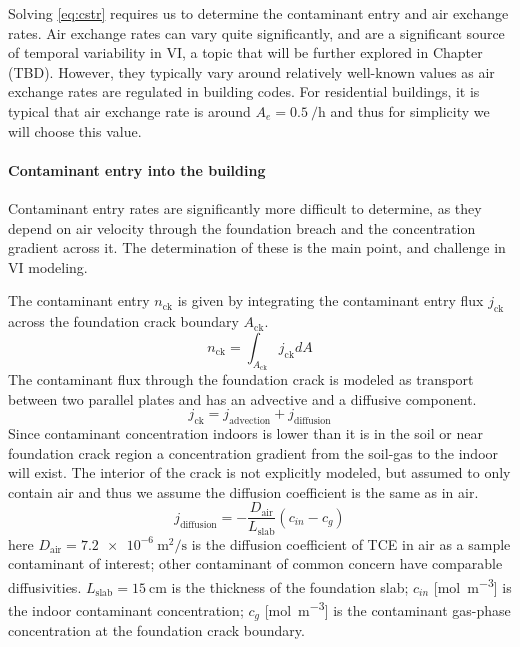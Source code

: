 Solving \eqref{eq:cstr} requires us to determine the contaminant entry and air exchange rates.
Air exchange rates can vary quite significantly, and are a significant source of temporal variability in VI, a topic that will be further explored in Chapter (TBD). %
However, they typically vary around relatively well-known values as air exchange rates are regulated in building codes.
For residential buildings, it is typical that air exchange rate is around $A_e = \SI{0.5}{\per\hour}$ and thus for simplicity we will choose this value.\par

\paragraph{Contaminant entry into the building}

Contaminant entry rates are significantly more difficult to determine, as they depend on air velocity through the foundation breach and the concentration gradient across it.
The determination of these is the main point, and challenge in VI modeling.\par


The contaminant entry $n_\mathrm{ck}$ is given by integrating the contaminant entry flux $j_\mathrm{ck}$ across the foundation crack boundary $A_\mathrm{ck}$.
\begin{equation}
  n_\mathrm{ck} = \int_{A_\mathrm{ck}} j_\mathrm{ck} dA
\end{equation}
The contaminant flux through the foundation crack is modeled as transport between two parallel plates and has an advective and a diffusive component.
\begin{equation}
  j_\mathrm{ck} = j_\mathrm{advection} + j_\mathrm{diffusion}
\end{equation}
Since contaminant concentration indoors is lower than it is in the soil or near foundation crack region a concentration gradient from the soil-gas to the indoor will exist.
The interior of the crack is not explicitly modeled, but assumed to only contain air and thus we assume the diffusion coefficient is the same as in air.
\begin{equation}
  j_\mathrm{diffusion} = - \frac{D_\mathrm{air}}{L_\mathrm{slab}} (c_{in} - c_g)
\end{equation}
here $D_\mathrm{air} = \SI{7.2e-6}{\metre\squared\per\second}$ is the diffusion coefficient of TCE in air as a sample contaminant of interest; other contaminant of common concern have comparable diffusivities. %
$L_\mathrm{slab} = \SI{15}{\centi\metre}$ is the thickness of the foundation slab;
$c_{in}$ [\si{\mol\per\metre\cubed}] is the indoor contaminant concentration;
$c_g$ [\si{\mol\per\metre\cubed}] is the contaminant gas-phase concentration at the foundation crack boundary.\par

